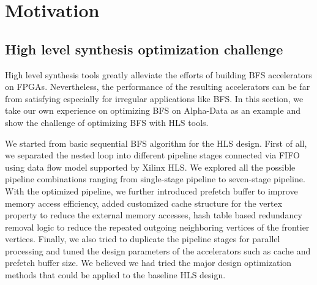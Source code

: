 \section{Motivation} \label{sec:motivation}
\subsection{High level synthesis optimization challenge}
High level synthesis tools greatly alleviate the efforts of building BFS accelerators on FPGAs. 
Nevertheless, the performance of the resulting accelerators can be far from satisfying 
especially for irregular applications like BFS. In this section, we take our own experience 
on optimizing BFS on Alpha-Data as an example and show the challenge of 
optimizing BFS with HLS tools.

We started from basic sequential BFS algorithm for 
the HLS design. First of all, we separated the nested loop into different pipeline 
stages connected via FIFO using data flow model supported by Xilinx HLS. 
We explored all the possible pipeline combinations ranging from single-stage 
pipeline to seven-stage pipeline. With the optimized pipeline, we further 
introduced prefetch buffer to improve memory access efficiency, 
added customized cache structure for the vertex property to reduce the external 
memory accesses, hash table based redundancy removal logic to reduce the repeated 
outgoing neighboring vertices of the frontier vertices. Finally, we also tried to 
duplicate the pipeline stages for parallel processing and tuned the design parameters 
of the accelerators such as cache and prefetch buffer size. We believed 
we had tried the major design optimization methods that could be applied to the 
baseline HLS design. 

%
%
%

